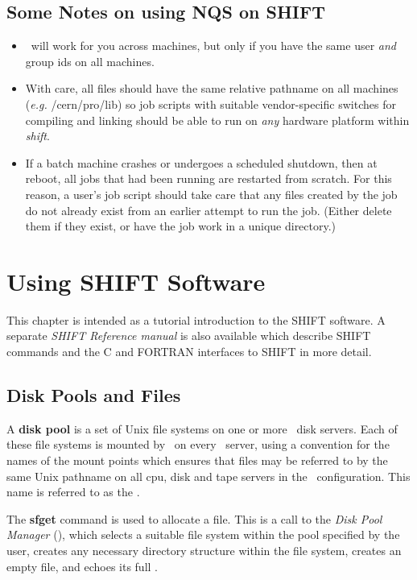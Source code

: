  
\section{Some Notes on using NQS on SHIFT}
\begin{itemize}
\item \NQS\ will work for you across machines, but only if
you have the same user {\it and} group ids on all machines.
\item With care, all files should have the same relative pathname
on all machines ({\it e.g.} /cern/pro/lib) so job scripts with suitable
vendor-specific switches for compiling and linking should be able
to run on {\it any} hardware platform within {\it shift}.
\item If a batch machine crashes or undergoes a scheduled shutdown,
then at reboot, all jobs that had been running are restarted from
scratch.  For this reason, a user's job script should take care that any files
created by the job do not already exist from an earlier attempt to
run the job.  (Either delete them if they exist, or have the job
work in a unique directory.)
\end{itemize}
 
\chapter{Using SHIFT Software}
 
This chapter is intended as a tutorial introduction to
the SHIFT software. A separate
{\em SHIFT Reference manual}
is also available which describe SHIFT commands and the C and FORTRAN
interfaces to SHIFT in more detail.
 
\section{Disk Pools and Files}
\label{sec:pools}
 
A {\bf disk pool} is a set of Unix file systems on one or more
\shift\ disk servers. Each of these file systems is mounted by \NFS\ on every
\shift\ server, using a convention for the names of the mount points which
 ensures that
files may be referred to by the same Unix
pathname on all cpu, disk and tape servers
in the \shift\ configuration. This name is referred to as the \nfspn.
 
The {\bf sfget} command is used to allocate a file. This is a call to the
{\it Disk Pool Manager} (\DPM), which selects a suitable file system within the
pool specified by the user, creates any necessary directory structure within
the file system, creates an empty file, and echoes its full \nfspn.
 
